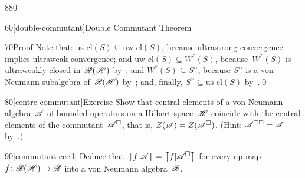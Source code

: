 \begin{parsec}{880}
\begin{point}{60}[double-commutant]{Double Commutant Theorem}
\begin{point}{70}{Proof}
Note that: $\mathrm{us}\text{-}\mathrm{cl}(S)
\subseteq  \mathrm{uw}\text{-}\mathrm{cl}(S)$,
because ultrastrong convergence implies ultraweak convergence;
and
$\mathrm{uw}\text{-}\mathrm{cl}(S)
\subseteq W^*(S)$,
because~$W^*(S)$ 
is ultraweakly closed in~$\mathscr{B}(\mathscr{H})$ by~;
and
$W^*(S)\subseteq S^{\square\square}$,
because 
$S^{\square\square}$ is a von Neumann subalgebra
of~$\mathscr{B}(\mathscr{H})$ by~;
and, finally, $S^{\square\square}\subseteq \mathrm{us}\text{-}\mathrm{cl}(S)$
by~.\qed
\end{point}
\end{point}
\begin{point}{80}[centre-commutant]{Exercise}
Show that central elements of
a von Neumann algebra~$\mathscr{A}$
of bounded operators on a Hilbert space~$\mathscr{H}$
coincide with the central elements of the commutant~$\mathscr{A}^\square$,
that is, $Z(\mathscr{A})=Z(\mathscr{A}^\square)$.
(Hint: $\mathscr{A}^{\square\square}=\mathscr{A}$ by~.)
\begin{point}{90}[commutant-cceil]%
Deduce that~$\cceil{f|\scrA}=\cceil{f|\scrA^\square}$
for every np-map~$f\colon \mathscr{B}(\mathscr{H})\to\mathscr{B}$ 
into a von Neumann algebra~$\mathscr{B}$.
\end{point}
\end{point}
\end{parsec}%
